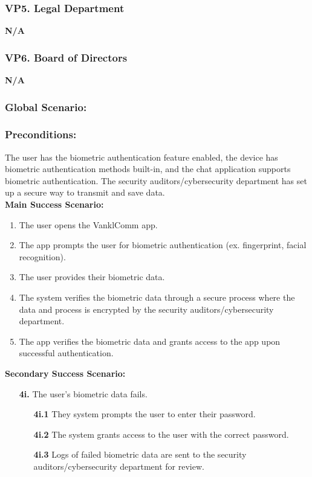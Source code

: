 \documentclass[]{article}
\begin{document}
\subsubsection*{VP5. Legal Department}
\textbf{N/A}
\subsubsection*{VP6. Board of Directors}
\textbf{N/A}

\subsubsection*{Global Scenario:}
\subsubsection*{Preconditions:} The user has the biometric authentication feature enabled, the device has biometric authentication methods built-in, and the chat application supports biometric authentication. The security auditors/cybersecurity department has set up a secure way to transmit and save data.\\
\textbf{Main Success Scenario:}
\begin{enumerate}
	\item The user opens the VanklComm app.
	\item The app prompts the user for biometric authentication (ex. fingerprint, facial recognition).
	\item The user provides their biometric data.
	\item The system verifies the biometric data through a secure process where the data and process is encrypted by the security auditors/cybersecurity department.
	\item The app verifies the biometric data and grants access to the app upon successful authentication.
\end{enumerate}
\textbf{Secondary Success Scenario:}
\begin{enumerate}
	\item[\textbf{4i.}] The user's biometric data fails.
		\begin{enumerate}
			\item[\textbf{4i.1}] They system prompts the user to enter their password.
			\item[\textbf{4i.2}] The system grants access to the user with the correct password.
			\item[\textbf{4i.3}] Logs of failed biometric data are sent to the security auditors/cybersecurity department for review.
		\end{enumerate}
\end{enumerate}
\end{document}
